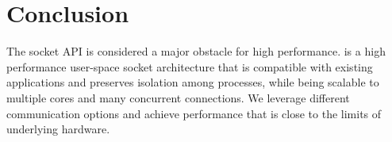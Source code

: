 \section{Conclusion}
\label{sec:conclusion}

The socket API is considered a major obstacle for high performance. \sys is a high performance user-space socket architecture that is compatible with existing applications and preserves isolation among processes, while being scalable to multiple cores and many concurrent connections. We leverage different communication options and achieve performance that is close to the limits of underlying hardware. %
